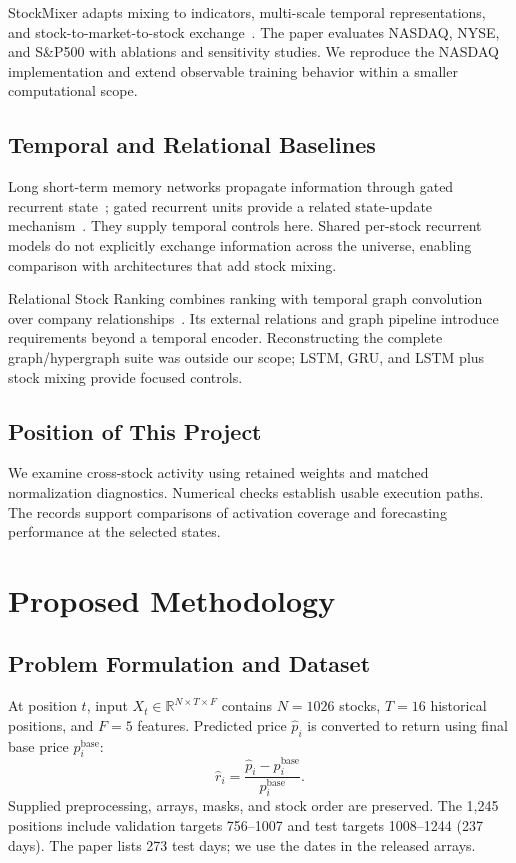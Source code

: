 \documentclass[conference]{IEEEtran}
\begin{document}
StockMixer adapts mixing to indicators, multi-scale temporal representations, and stock-to-market-to-stock exchange~\cite{stockmixer}. The paper evaluates NASDAQ, NYSE, and S\&P500 with ablations and sensitivity studies. We reproduce the NASDAQ implementation and extend observable training behavior within a smaller computational scope.

\subsection{Temporal and Relational Baselines}
Long short-term memory networks propagate information through gated recurrent state~\cite{lstm}; gated recurrent units provide a related state-update mechanism~\cite{gru}. They supply temporal controls here. Shared per-stock recurrent models do not explicitly exchange information across the universe, enabling comparison with architectures that add stock mixing.

Relational Stock Ranking combines ranking with temporal graph convolution over company relationships~\cite{rsr}. Its external relations and graph pipeline introduce requirements beyond a temporal encoder. Reconstructing the complete graph/hypergraph suite was outside our scope; LSTM, GRU, and LSTM plus stock mixing provide focused controls.

\subsection{Position of This Project}
We examine cross-stock activity using retained weights and matched normalization diagnostics. Numerical checks establish usable execution paths. The records support comparisons of activation coverage and forecasting performance at the selected states.

\section{Proposed Methodology}
\subsection{Problem Formulation and Dataset}
At position $t$, input $X_t\in\mathbb{R}^{N\times T\times F}$ contains $N=1026$ stocks, $T=16$ historical positions, and $F=5$ features. Predicted price $\hat p_i$ is converted to return using final base price $p_i^{\mathrm{base}}$:
\begin{equation}
\hat r_i=\frac{\hat p_i-p_i^{\mathrm{base}}}{p_i^{\mathrm{base}}}.
\label{eq:return}
\end{equation}
Supplied preprocessing, arrays, masks, and stock order are preserved. The 1,245 positions include validation targets 756--1007 and test targets 1008--1244 (237 days). The paper lists 273 test days; we use the dates in the released arrays.
\end{document}
